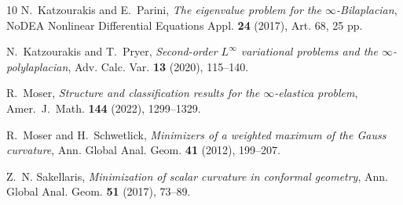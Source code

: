 \documentclass[a4paper]{article}
\theoremstyle{remark}
\begin{document}
\begin{thebibliography}{10}
N.~Katzourakis and E.~Parini, \emph{The eigenvalue problem for the {$\infty
  $}-{B}ilaplacian}, NoDEA Nonlinear Differential Equations Appl. \textbf{24}
  (2017), Art. 68, 25 pp.

N.~Katzourakis and T.~Pryer, \emph{Second-order {$L^\infty$} variational
  problems and the {$\infty$}-polylaplacian}, Adv. Calc. Var. \textbf{13}
  (2020), 115--140.

R.~Moser, \emph{Structure and classification results for the $\infty$-elastica
  problem}, Amer.\ J.\ Math. \textbf{144} (2022), 1299--1329.

R.~Moser and H.~Schwetlick, \emph{Minimizers of a weighted maximum of the
  {G}auss curvature}, Ann. Global Anal. Geom. \textbf{41} (2012), 199--207.

Z.~N. Sakellaris, \emph{Minimization of scalar curvature in conformal
  geometry}, Ann. Global Anal. Geom. \textbf{51} (2017), 73--89.

\end{thebibliography}
\end{document}
